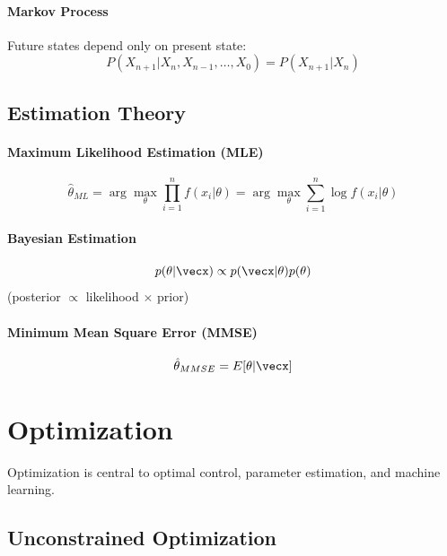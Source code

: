 \subsubsection{Markov Process}
Future states depend only on present state:
\begin{equation}
P(X_{n+1}|X_n, X_{n-1}, \ldots, X_0) = P(X_{n+1}|X_n)
\end{equation}

\section{Estimation Theory}

\subsubsection{Maximum Likelihood Estimation (MLE)}
\begin{equation}
\hat{\theta}_{ML} = \arg\max_\theta \prod_{i=1}^n f(x_i|\theta) = \arg\max_\theta \sum_{i=1}^n \log f(x_i|\theta)
\end{equation}

\subsubsection{Bayesian Estimation}
\begin{equation}
p(\theta|\vecx) \propto p(\vecx|\theta)p(\theta)
\end{equation}
(posterior $\propto$ likelihood $\times$ prior)

\subsubsection{Minimum Mean Square Error (MMSE)}
\begin{equation}
\hat{\theta}_{MMSE} = E[\theta|\vecx]
\end{equation}

\chapter{Optimization}
\label{ch:optimization}

Optimization is central to optimal control, parameter estimation, and machine learning.

\section{Unconstrained Optimization}

